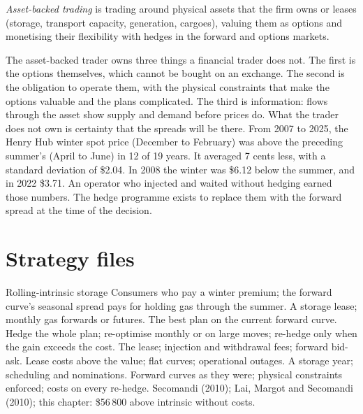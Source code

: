 \begin{definition}\label{def:s2:storage-transport-and-physical-optionality:assetbacked}
\emph{Asset-backed trading} is trading around physical assets that the firm owns or leases (storage, transport capacity,
generation, cargoes), valuing them as options and monetising their flexibility with hedges in the forward and options markets.
\end{definition}

The asset-backed trader owns three things a financial trader does not. The first is the options themselves, which cannot be bought on an exchange.
The second is the obligation to operate them, with the physical constraints that make the options valuable and the plans complicated. The third is
information: flows through the asset show supply and demand before prices do. What the trader does not own is certainty that the spreads will be there.
From 2007 to 2025, the Henry Hub winter spot price (December to February) was above the preceding summer's (April to June) in 12 of 19 years. It
averaged 7 cents less, with a standard deviation of \$2.04. In 2008 the winter was \$6.12 below the summer, and in 2022 \$3.71. An operator who injected
and waited without hedging earned those numbers. The hedge programme exists to replace them with the forward spread at the time of the decision.

\section{Strategy files}

\begin{strategyfile}{Rolling-intrinsic storage}\label{strat:s2:storage-transport-and-physical-optionality:rolling}
 Consumers who pay a winter premium; the forward curve's seasonal spread pays for holding gas through the summer.
 A storage lease; monthly gas forwards or futures.
 The best plan on the current forward curve.
 Hedge the whole plan; re-optimise monthly or on large moves; re-hedge only when the gain exceeds the cost.
 The lease; injection and withdrawal fees; forward bid-ask.
 Lease costs above the value; flat curves; operational outages.
 A storage year; scheduling and nominations.
 Forward curves as they were; physical constraints enforced; costs on every re-hedge.
 Secomandi (2010); Lai, Margot and Secomandi (2010); this chapter: \$56\,800 above intrinsic without costs.
\end{strategyfile}

